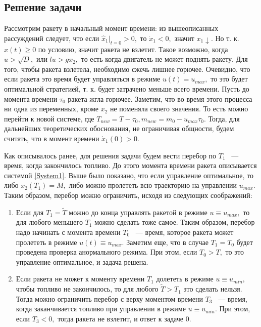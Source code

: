 \documentclass[10pt,pdf,hyperref={unicode}]{beamer}
\begin{document}
	\subsection{Решение задачи}
		Рассмотрим ракету в начальный момент времени: из вышеописанных рассуждений следует, 
		что если $\hat x_1 |_{t = 0} > 0,$ то $\dot x_1 < 0,$ значит $x_1 \downarrow.$ Но т. к. 
		$x(t) \ge 0$ по условию, значит ракета не взлетит. Такое возможно, когда $u > \sqrt{D},$
		или $lu > gx_2,$ то есть когда двигатель не может поднять ракету. Для того, чтобы ракета 
		взлетела, необходимо сжечь лишнее горючее. Очевидно, что если ракета это время будет управляться
		в режиме $u(t) = u_{max},$ то это будет оптимальной стратегией, т. к. будет затрачено меньше всего времени.
		Пусть до момента времени $\tau_0$ ракета жгла горючее. Заметим, что во время этого процесса ни одна из переменных, кроме $x_2$
		не поменяла своего значения. То есть можно перейти к новой системе, 
		где $T_{new} = T - \tau_0, m_{new} = m_0 - u_{max}\tau_0.$
		Тогда, для дальнейших теоретических обоснования, не ограничивая общности, будем считать, что в момент времени
		$\dot x_1(0) > 0.$

		Как описывалось ранее, для решения задачи будем вести перебор по $T_1$ ~--- время, когда
		закончилось топливо. До этого момента времени ракета описывается системой \eqref{System1}. 
		Выше было показано, что если управление оптимальное, то
		либо $x_2(T_1) = M,$ либо можно пролететь всю траекторию на управлении $u_{max}.$
		Таким образом, перебор можно ограничить, исходя из следующих соображений:
		\begin{enumerate}
		\item Если для $T_1 = \tilde T$ можно до конца управлять ракетой в режиме $u \equiv u_{max},$
		то для любого меньшего $T_1$ можно сделать тоже самое. Таким образом, перебор надо начинать с момента
		времени $T_0$ ~--- время, которое ракета может пролететь в режиме $u(t) \equiv u_{max}.$
		Заметим еще, что в случае $T_1 = T_0$ будет проведена проверка анормального режима.
		При этом, если $T_0 > T,$ то это управление оптимальное, и задача решена.
		\item Если ракета не может к моменту времени $T_1$ долететь в режиме $u \equiv u_{min},$ чтобы топливо не закончилось,
		то для любого $\tilde T > T_1$ это сделать нельзя. Тогда можно ограничить перебор с верху моментом времени 
		$T_3$ ~--- время, когда заканчивается топливо при управлении в режиме $u \equiv u_{min}.$
		При этом, если $T_3 < 0,$ тогда ракета не взлетит, и ответ к задаче $0.$
		\end{enumerate}
\end{document}

